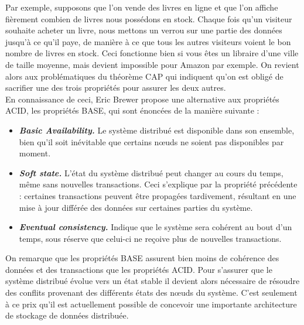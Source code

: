 	Par exemple, supposons que l'on vende des livres en ligne et que l'on affiche fièrement combien de livres nous possédons en stock. Chaque fois qu'un visiteur souhaite acheter un livre, nous mettons un verrou sur une partie des données jusqu'à ce qu'il paye, de manière à ce que tous les autres visiteurs voient le bon nombre de livres en stock. Ceci fonctionne bien si vous êtes un libraire d'une ville de taille moyenne, mais devient impossible pour Amazon par exemple. On revient alors aux problématiques du théorème CAP qui indiquent qu'on est obligé de sacrifier une des trois propriétés pour assurer les deux autres.\\

	En connaissance de ceci, Eric Brewer propose une alternative aux propriétés ACID, les propriétés BASE, qui sont énoncées de la manière suivante :
	\vspace{10px}
	\begin{itemize}
	 	\item \textbf{\textit{Basic Availability.}} Le système distribué est disponible dans son ensemble, bien qu'il soit inévitable que certains nœuds ne soient pas disponibles par moment.
	 	\item \textbf{\textit{Soft state.}} L'état du système distribué peut changer au cours du temps, même sans nouvelles transactions. Ceci s'explique par la propriété précédente : certaines transactions peuvent être propagées tardivement, résultant en une mise à jour différée des données sur certaines parties du système.
	 	\item \textbf{\textit{Eventual consistency.}} Indique que le système sera cohérent au bout d'un temps, sous réserve que celui-ci ne reçoive plus de nouvelles transactions.
	 \end{itemize}
	 \vspace{20px}
	 On remarque que les propriétés BASE assurent bien moins de cohérence des données et des transactions que les propriétés ACID. Pour s'assurer que le système distribué évolue vers un état stable il devient alors nécessaire de résoudre des conflits provenant des différents états des nœuds du système. C'est seulement à ce prix qu'il est actuellement possible de concevoir une importante architecture de stockage de données distribuée.